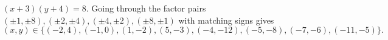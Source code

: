 $(x+3)(y+4)=8$. Going through the factor pairs $(\pm1,\pm8),(\pm2,\pm4),(\pm4,\pm2),(\pm8,\pm1)$ with matching signs gives
\[(x,y)\in\boxed{\{(-2,4),(-1,0),(1,-2),(5,-3),(-4,-12),(-5,-8),(-7,-6),(-11,-5)\}}.\]
